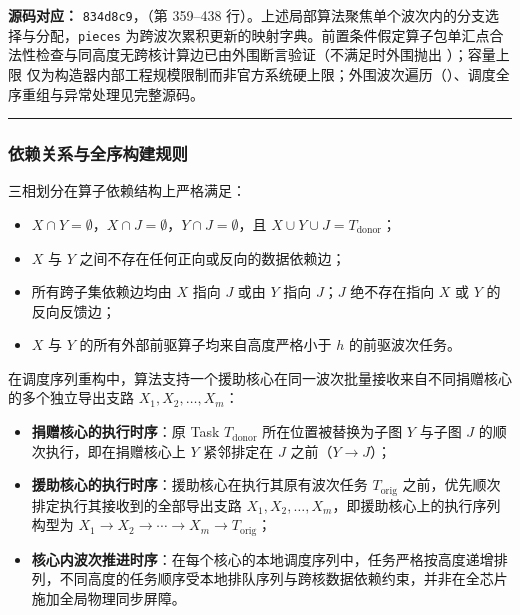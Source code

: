 \documentclass[anonymous,withtoc]{gmcm2026}
\providecommand{\tightlist}{\setlength{\itemsep}{0pt}\setlength{\parskip}{0pt}}
\begin{document}
\textbf{源码对应：} \texttt{834d8c9}，\texttt{}（第 359--438 行）。上述局部算法聚焦单个波次内的分支选择与分配，\texttt{pieces} 为跨波次累积更新的映射字典。前置条件假定算子包单汇点合法性检查与同高度无跨核计算边已由外围断言验证（不满足时外围抛出 \texttt{}）；容量上限 \texttt{} 仅为构造器内部工程规模限制而非官方系统硬上限；外围波次遍历（\texttt{}）、调度全序重组与异常处理见完整源码。

\par\hrule\endgroup

\subsubsection{依赖关系与全序构建规则}

三相划分在算子依赖结构上严格满足：

\begin{itemize}
\tightlist
\item
  \(X \cap Y = \emptyset\)，\(X \cap J = \emptyset\)，\(Y \cap J = \emptyset\)，且 \(X \cup Y \cup J = T_{\mathrm{donor}}\)；
\item
  \(X\) 与 \(Y\) 之间不存在任何正向或反向的数据依赖边；
\item
  所有跨子集依赖边均由 \(X\) 指向 \(J\) 或由 \(Y\) 指向 \(J\)；\(J\) 绝不存在指向 \(X\) 或 \(Y\) 的反向反馈边；
\item
  \(X\) 与 \(Y\) 的所有外部前驱算子均来自高度严格小于 \(h\) 的前驱波次任务。
\end{itemize}

在调度序列重构中，算法支持一个援助核心在同一波次批量接收来自不同捐赠核心的多个独立导出支路 \(X_1, X_2, \dots, X_m\)：

\begin{itemize}
\tightlist
\item
  \textbf{捐赠核心的执行时序}：原 Task \(T_{\mathrm{donor}}\) 所在位置被替换为子图 \(Y\) 与子图 \(J\) 的顺次执行，即在捐赠核心上 \(Y\) 紧邻排定在 \(J\) 之前（\(Y \to J\)）；
\item
  \textbf{援助核心的执行时序}：援助核心在执行其原有波次任务 \(T_{\mathrm{orig}}\) 之前，优先顺次排定执行其接收到的全部导出支路 \(X_1, X_2, \dots, X_m\)，即援助核心上的执行序列构型为 \(X_1 \to X_2 \to \cdots \to X_m \to T_{\mathrm{orig}}\)；
\item
  \textbf{核心内波次推进时序}：在每个核心的本地调度序列中，任务严格按高度递增排列，不同高度的任务顺序受本地排队序列与跨核数据依赖约束，并非在全芯片施加全局物理同步屏障。
\end{itemize}
\end{document}
